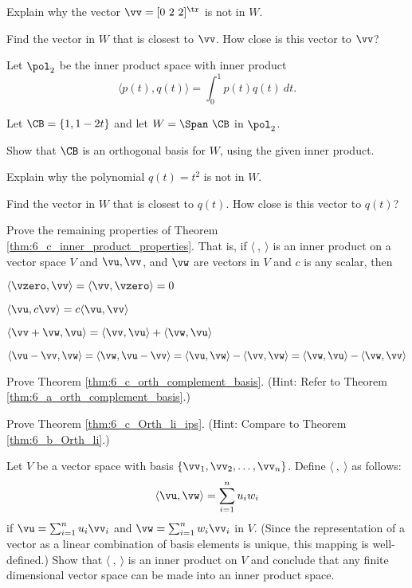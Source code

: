     \item Explain why the vector $\vv = [0 \ 2 \ 2]^{\tr}$ is not in $W$.
    
    \item Find the vector in $W$ that is closest to $\vv$. How close is this vector to $\vv$?
    
    \ea 
    
\item  Let $\pol_2$ be the inner product space with inner product
\[\langle p(t), q(t) \rangle = \int_0^1 p(t)q(t) \ dt.\]

Let $\CB = \{1, 1-2t\}$ and let $W = \Span \ \CB$ in $\pol_2$. 
   \ba
    \item Show that $\CB$ is an orthogonal basis for $W$, using the given inner product. 
    
    \item Explain why the polynomial $q(t) = t^2$ is not in $W$.
    
    \item Find the vector in $W$ that is closest to $q(t)$. How close is this vector to $q(t)$?
    
    \ea 
    
\item Prove the remaining properties of Theorem \ref{thm:6_c_inner_product_properties}. That is, if $\langle \ , \ \rangle$ is an inner product on a vector space $V$ and $\vu, \vv$, and $\vw$ are vectors in $V$ and $c$ is any scalar, then
	\be
	\item $\langle \vzero , \vv \rangle = \langle \vv , \vzero \rangle = 0$
	\item $\langle \vu , c\vv \rangle = c\langle \vu , \vv \rangle$
	\item $\langle \vv+\vw , \vu \rangle = \langle \vv , \vu \rangle + \langle \vw , \vu \rangle$
\item $\langle \vu - \vv, \vw \rangle = \langle \vw, \vu - \vv \rangle= \langle \vu , \vw \rangle - \langle \vv , \vw \rangle= \langle \vw, \vu \rangle - \langle \vw, \vv \rangle$
	\ee

\item Prove Theorem \ref{thm:6_c_orth_complement_basis}. (Hint: Refer to Theorem \ref{thm:6_a_orth_complement_basis}.)


\item Prove Theorem \ref{thm:6_c_Orth_li_ips}. (Hint: Compare to Theorem \ref{thm:6_b_Orth_li}.)

\item Let $V$ be a vector space with basis $\{\vv_1, \vv_2, \ldots, \vv_n\}$. Define $\langle \ , \ \rangle$ as follows:
\[\langle \vu, \vw \rangle = \sum_{i=1}^n u_iw_i\]
if $\vu = \sum_{i=1}^n u_i \vv_i$ and $\vw = \sum_{i=1}^n w_i \vv_i$ in $V$. (Since the representation of a vector as a linear combination of basis elements is unique, this mapping is well-defined.) Show that $\langle \ , \ \rangle$ is an inner product on $V$ and conclude that any finite dimensional vector space can be made into an inner product space. 

